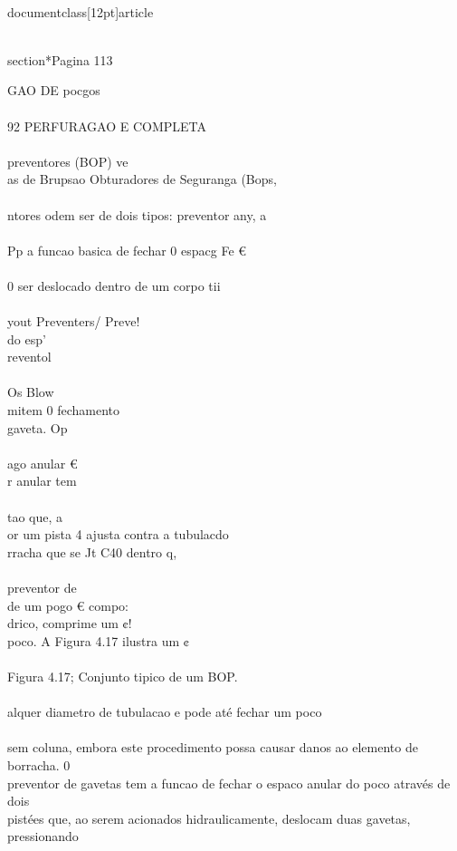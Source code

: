 \\documentclass[12pt]{article}
\begin{document}
\\section*{Pagina 113}

GAO DE pocgos\\
\\
92 PERFURAGAO E COMPLETA\\
\\
preventores (BOP) ve\\
as de Brupsao Obturadores de Seguranga (Bops,\\
\\
ntores odem ser de dois tipos: preventor any, a\\
\\
Pp a funcao basica de fechar 0 espacg Fe €\\
\\
0 ser deslocado dentro de um corpo tii\\
\\
yout Preventers/ Preve!\\
do esp’\\
reventol\\
\\
Os Blow\\
mitem 0 fechamento\\
gaveta. Op\\
\\
ago anular €\\
r anular tem\\
\\
tao que, a\\
or um pista 4 ajusta contra a tubulacdo\\
rracha que se Jt C40 dentro q,\\
\\
preventor de\\
de um pogo  € compo:\\
drico, comprime um ¢!\\
poco. A Figura 4.17 ilustra um ¢\\
\\
Figura 4.17; Conjunto tipico de um BOP.\\
\\
alquer diametro de tubulacao e pode até fechar um poco\\
\\
sem coluna, embora este procedimento possa causar danos ao elemento de borracha. 0\\
preventor de gavetas tem a funcao de fechar o espaco anular do poco através de dois\\
pistées que, ao serem acionados hidraulicamente, deslocam duas gavetas, pressionando\\
\end{document}
